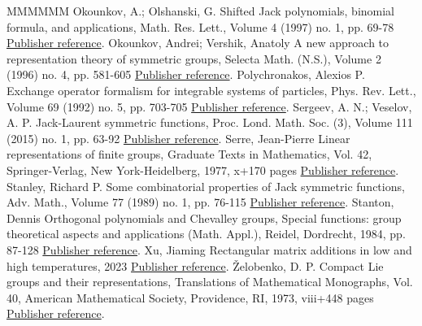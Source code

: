 \documentclass[11pt]{article}
\theoremstyle{definition}
\numberwithin{equation}{section}
\begin{document}
\begin{thebibliography}{MMMMMM}
 Okounkov, A.; Olshanski, G. Shifted Jack polynomials, binomial formula, and applications, Math. Res. Lett., Volume 4 (1997) no. 1, pp. 69-78 \href{https://alco.centre-mersenne.org/articles/10.5802/alco.451/#okounkov1997shifted}{Publisher reference}.
 Okounkov, Andrei; Vershik, Anatoly A new approach to representation theory of symmetric groups, Selecta Math. (N.S.), Volume 2 (1996) no. 4, pp. 581-605 \href{https://alco.centre-mersenne.org/articles/10.5802/alco.451/#okounkov1996new}{Publisher reference}.
 Polychronakos, Alexios P. Exchange operator formalism for integrable systems of particles, Phys. Rev. Lett., Volume 69 (1992) no. 5, pp. 703-705 \href{https://alco.centre-mersenne.org/articles/10.5802/alco.451/#polychronakos1992exchange}{Publisher reference}.
 Sergeev, A. N.; Veselov, A. P. Jack-Laurent symmetric functions, Proc. Lond. Math. Soc. (3), Volume 111 (2015) no. 1, pp. 63-92 \href{https://alco.centre-mersenne.org/articles/10.5802/alco.451/#sergeev2015jack}{Publisher reference}.
 Serre, Jean-Pierre Linear representations of finite groups, Graduate Texts in Mathematics, Vol. 42, Springer-Verlag, New York-Heidelberg, 1977, x+170 pages \href{https://alco.centre-mersenne.org/articles/10.5802/alco.451/#serre1977linear}{Publisher reference}.
 Stanley, Richard P. Some combinatorial properties of Jack symmetric functions, Adv. Math., Volume 77 (1989) no. 1, pp. 76-115 \href{https://alco.centre-mersenne.org/articles/10.5802/alco.451/#stanley1989some}{Publisher reference}.
 Stanton, Dennis Orthogonal polynomials and Chevalley groups, Special functions: group theoretical aspects and applications (Math. Appl.), Reidel, Dordrecht, 1984, pp. 87-128 \href{https://alco.centre-mersenne.org/articles/10.5802/alco.451/#Stanton1984}{Publisher reference}.
 Xu, Jiaming Rectangular matrix additions in low and high temperatures, 2023 \href{https://alco.centre-mersenne.org/articles/10.5802/alco.451/#xu2023rectangular}{Publisher reference}.
 Želobenko, D. P. Compact Lie groups and their representations, Translations of Mathematical Monographs, Vol. 40, American Mathematical Society, Providence, RI, 1973, viii+448 pages \href{https://alco.centre-mersenne.org/articles/10.5802/alco.451/#zhelobenko1973compact}{Publisher reference}.
\end{thebibliography}
\end{document}
